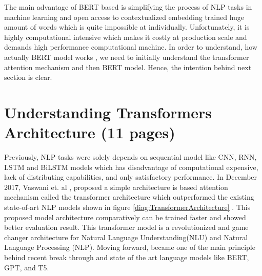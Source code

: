 \documentclass[%
	BCOR=8mm, %
	DIV=12, 
	toc=bibliography, %
	toc=listof, %
	oneside, %
	egregdoesnotlikesansseriftitles, %
	]{scrbook}
\begin{document}
 The main advantage of BERT based is simplifying the process of NLP tasks in machine learning and open access to contextualized embedding trained huge amount of words which is 
 quite impossible at individually. Unfortunately, it is highly computational intensive which makes it costly at production scale and demands high performance computational machine.
In order to understand, how actually BERT model works , we need to initially understand the transformer attention mechanism and then BERT model. Hence, the intention behind next 
section is clear.

\section{Understanding Transformers Architecture (11 pages)}
Previously, NLP tasks were solely depends on sequential model like CNN, RNN, LSTM and BiLSTM models which has disadvantage of computational expensive, lack of distributing 
capabilities, and only satisfactory performance. In December 2017, Vaswani et. al \cite{vaswani_attention_2017}, proposed a simple architecture is based attention mechanism called 
the transformer architecture which outperformed the existing state-of-art NLP models shown in figure \ref{diag:TransformerArchitecture} . This proposed model architecture  comparatively 
can be  trained faster and showed better evaluation result. This transformer model is a revolutionized and game changer architecture for Natural Language Understanding(NLU) and Natural
Language Processing (NLP). Moving forward, became one of the main principle behind recent break through and state of the art language models like BERT, GPT, and T5.\\ 
 
\end{document}
